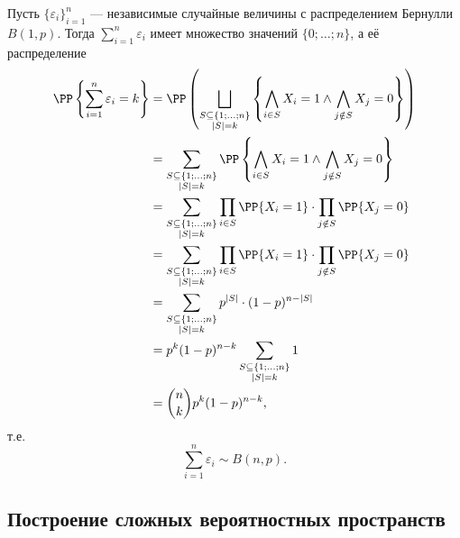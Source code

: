 \documentclass[12pt,a4paper]{article}
\begin{document}
    \begin{example}
        Пусть $\{\varepsilon_i\}_{i=1}^n$ --- независимые случайные величины с распределением Бернулли $B(1, p)$. Тогда $\sum_{i=1}^n \varepsilon_i$ имеет множество значений $\{0; \dots; n\}$, а её распределение
        \begin{align*}
            \PP\left\{\sum_{i=1}^n \varepsilon_i = k\right\}
            &= \PP\left(\bigsqcup_{\substack{S \subseteq \{1; \dots; n\}\\ |S| = k}} \left\{\bigwedge_{i \in S} X_i = 1 \wedge \bigwedge_{j \notin S} X_j = 0\right\}\right)\\
            &= \sum_{\substack{S \subseteq \{1; \dots; n\}\\ |S| = k}} \PP\left\{\bigwedge_{i \in S} X_i = 1 \wedge \bigwedge_{j \notin S} X_j = 0\right\}\\
            &= \sum_{\substack{S \subseteq \{1; \dots; n\}\\ |S| = k}} \prod_{i \in S} \PP\{X_i = 1\} \cdot \prod_{j \notin S} \PP\{X_j = 0\}\\
            &= \sum_{\substack{S \subseteq \{1; \dots; n\}\\ |S| = k}} \prod_{i \in S} \PP\{X_i = 1\} \cdot \prod_{j \notin S} \PP\{X_j = 0\}\\
            &= \sum_{\substack{S \subseteq \{1; \dots; n\}\\ |S| = k}} p^{|S|} \cdot (1-p)^{n-|S|}\\
            &= p^k (1-p)^{n-k} \sum_{\substack{S \subseteq \{1; \dots; n\}\\ |S| = k}} 1\\
            &= \binom{n}{k} p^k (1-p)^{n-k},
        \end{align*}
        т.е.
        \[\sum_{i=1}^n \varepsilon_i \sim B(n, p).\]
    \end{example}

    \subsection{Построение сложных вероятностных пространств}
\end{document}
